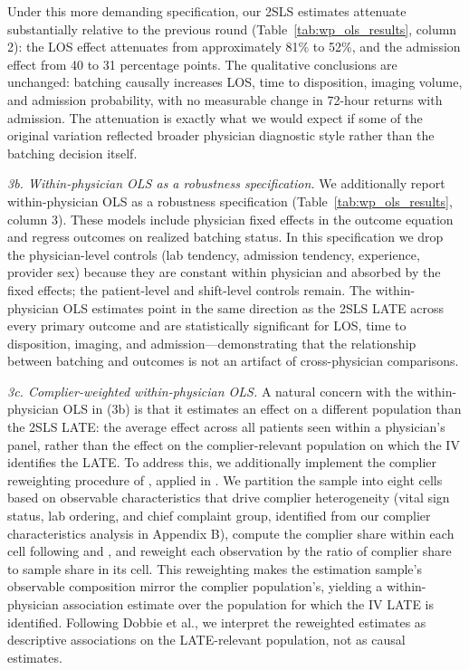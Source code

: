\documentclass[11pt]{article}
\newcommand{\1}{\hbox{\rm 1\kern-.35em 1}}
\begin{document}
Under this more demanding specification, our 2SLS estimates attenuate substantially relative to the previous round (Table~\ref{tab:wp_ols_results}, column 2): the LOS effect attenuates from approximately 81\% to 52\%, and the admission effect from 40 to 31 percentage points. The qualitative conclusions are unchanged: batching causally increases LOS, time to disposition, imaging volume, and admission probability, with no measurable change in 72-hour returns with admission. The attenuation is exactly what we would expect if some of the original variation reflected broader physician diagnostic style rather than the batching decision itself.

\textit{3b. Within-physician OLS as a robustness specification.} We additionally report within-physician OLS as a robustness specification (Table~\ref{tab:wp_ols_results}, column 3). These models include physician fixed effects in the outcome equation and regress outcomes on realized batching status. In this specification we drop the physician-level controls (lab tendency, admission tendency, experience, provider sex) because they are constant within physician and absorbed by the fixed effects; the patient-level and shift-level controls remain. The within-physician OLS estimates point in the same direction as the 2SLS LATE across every primary outcome and are statistically significant for LOS, time to disposition, imaging, and admission---demonstrating that the relationship between batching and outcomes is not an artifact of cross-physician comparisons.

\textit{3c. Complier-weighted within-physician OLS.} A natural concern with the within-physician OLS in (3b) is that it estimates an effect on a different population than the 2SLS LATE: the average effect across all patients seen within a physician's panel, rather than the effect on the complier-relevant population on which the IV identifies the LATE. To address this, we additionally implement the complier reweighting procedure of \citet{bhuller2020incarceration}, applied in \citet{dobbie2018effects, footnote 19}. We partition the sample into eight cells based on observable characteristics that drive complier heterogeneity (vital sign status, lab ordering, and chief complaint group, identified from our complier characteristics analysis in Appendix B), compute the complier share within each cell following \citet{abadie2003} and \citet{dahl2014family}, and reweight each observation by the ratio of complier share to sample share in its cell. This reweighting makes the estimation sample's observable composition mirror the complier population's, yielding a within-physician association estimate over the population for which the IV LATE is identified. Following Dobbie et al., we interpret the reweighted estimates as descriptive associations on the LATE-relevant population, not as causal estimates.
\end{document}
